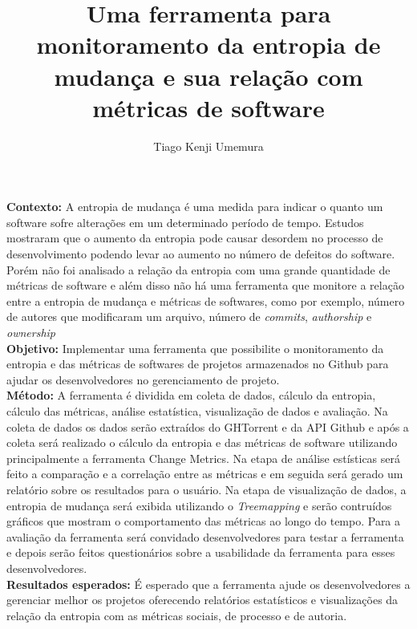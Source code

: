 \documentclass[12pt,english,brazil,a4paper,utf8,oneside]{utfpr-tcc}
\author{Tiago Kenji Umemura}  %
\title{Uma ferramenta para monitoramento da entropia de mudança e sua relação com métricas de software} %
\begin{document}
	
\frontmatter
\maketitle

\begin{resumo}

\textbf{Contexto:} A entropia de mudança é uma medida para indicar o quanto um software sofre alterações em um determinado período de tempo. Estudos mostraram que o aumento da entropia pode causar desordem no processo de desenvolvimento podendo levar ao aumento no número de defeitos do software. Porém não foi analisado a relação da entropia com uma grande quantidade de métricas de software e além disso não há uma ferramenta que monitore a relação entre a entropia de mudança e métricas de softwares, como por exemplo, número de autores que modificaram um arquivo, número de \textit{commits}, \textit{authorship} e \textit{ownership}\\
\textbf{Objetivo:} Implementar uma ferramenta que possibilite o monitoramento da entropia e das métricas de softwares de projetos armazenados no Github para ajudar os desenvolvedores no gerenciamento de projeto. \\
\textbf{Método:} A ferramenta é dividida em coleta de dados, cálculo da entropia, cálculo das métricas, análise estatística, visualização de dados e avaliação.
Na coleta de dados os dados serão extraídos do GHTorrent e da API Github e após a coleta será realizado o cálculo da entropia e das métricas de software utilizando principalmente a ferramenta Change Metrics. Na etapa de análise estísticas será feito a comparação e a correlação entre as métricas e em seguida será gerado um relatório sobre os resultados para o usuário. Na etapa de visualização de dados, a entropia de mudança será exibida utilizando o \textit{Treemapping} e serão contruídos gráficos que mostram o comportamento das métricas ao longo do tempo. Para a avaliação da ferramenta será convidado desenvolvedores para testar a ferramenta e depois serão feitos questionários sobre a usabilidade da ferramenta para esses desenvolvedores.\\
\textbf{Resultados esperados:} É esperado que a ferramenta ajude os desenvolvedores a gerenciar melhor os projetos oferecendo relatórios estatísticos e visualizações da relação da entropia com as métricas sociais, de processo e de autoria.

\end{resumo}
\end{document}

